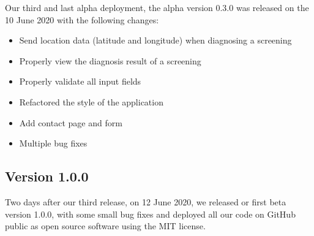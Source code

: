 Our third and last alpha deployment, the alpha version 0.3.0 was released on the 10 June 2020 with the following changes:

\begin{itemize}

\item
Send location data (latitude and longitude) when diagnosing a screening
\item
Properly view the diagnosis result of a screening
\item
Properly validate all input fields
\item
Refactored the style of the application
\item
Add contact page and form
\item
Multiple bug fixes

\end{itemize}

\subsection{Version 1.0.0}

Two days after our third release, on 12 June 2020, we released or first beta version 1.0.0, with some small bug fixes and deployed all our code on GitHub public as open source software using the MIT license.

